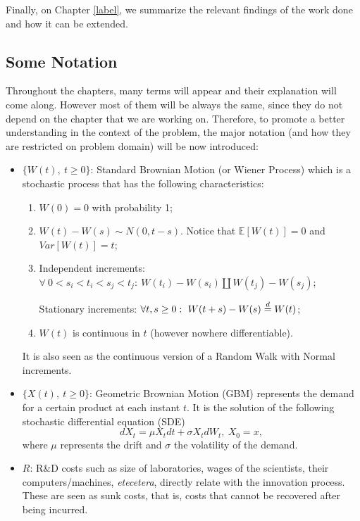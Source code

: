 Finally, on Chapter \ref{label}, we summarize the relevant findings of the work done and how it can be extended.




\subsection{Some Notation}
\label{intro:notation}

Throughout the chapters, many terms will appear and their explanation will come along. However most of them will be always the same, since they do not depend on the chapter that we are working on. Therefore, to promote a better understanding in the context of the problem, the major notation (and how they are restricted on problem domain) will be now introduced:
\begin{itemize}
	\item $\{ W(t), \ t \geq 0 \}$: Standard Brownian Motion (or Wiener Process) which is a stochastic process that has the following characteristics:
	\begin{enumerate}
		\item $W(0) = 0$ with probability 1;
		\item $W(t) - W(s) \sim N(0, t-s)$. Notice that $\mathds{E}[W(t)] = 0$ and $Var[W(t)] = t$;
		\item Independent increments: $\forall \ 0 < s_i < t_i < s_j < t_j: \ W(t_i) - W(s_i) \amalg W(t_j) - W(s_j) $;
		
		Stationary increments:  $\forall t,s \geq 0: \ W(t+s) - W(s) \buildrel d\over= W(t) $;
		\item $W(t)$ is continuous in $t$ (however nowhere differentiable).
	\end{enumerate}
It is also seen as the continuous version of a Random Walk with Normal increments.

	\item  $\{ X(t), \ t \geq 0 \}$: Geometric Brownian Motion (GBM) represents the demand for a certain product at each instant $t$. It is the solution of the following stochastic differential equation (SDE)
	$$ dX_t=\mu X_t dt + \sigma X_t d W_t, \ X_0=x, $$
	where $\mu$ represents the drift and $\sigma$ the volatility of the demand.
	
	\item $R$: R\&D costs such as size of laboratories, wages of the scientists, their computers/machines, \textit{etecetera}, directly relate with the innovation process. These are seen as sunk costs, that is, costs that cannot be recovered after being incurred.
	

\end{itemize}
